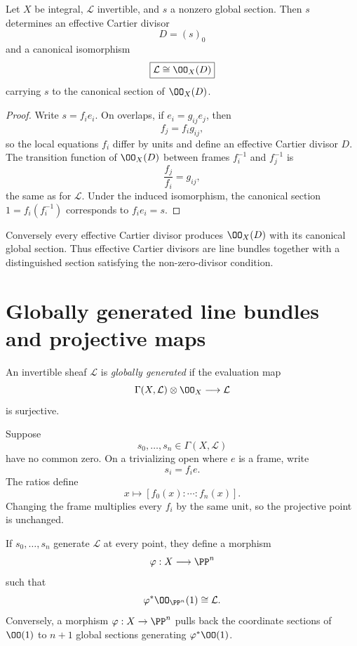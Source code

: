 \begin{theorem}\label{thm:vi42-section-divisor}
Let \(X\) be integral, \(\mathcal L\) invertible, and \(s\) a nonzero global section.  Then \(s\) determines an effective Cartier divisor
\[
  D=(s)_0
\]
and a canonical isomorphism
\[
  \boxed{\mathcal L\cong\OO_X(D)}
\]
carrying \(s\) to the canonical section of \(\OO_X(D)\).
\end{theorem}

\begin{proof}
Write \(s=f_i e_i\).  On overlaps, if \(e_i=g_{ij}e_j\), then
\[
  f_j=f_i g_{ij},
\]
so the local equations \(f_i\) differ by units and define an effective Cartier divisor \(D\).  The transition function of \(\OO_X(D)\) between frames \(f_i^{-1}\) and \(f_j^{-1}\) is
\[
  \frac{f_j}{f_i}=g_{ij},
\]
the same as for \(\mathcal L\).  Under the induced isomorphism, the canonical section \(1=f_i(f_i^{-1})\) corresponds to \(f_i e_i=s\).
\end{proof}

Conversely every effective Cartier divisor produces \(\OO_X(D)\) with its canonical global section.  Thus effective Cartier divisors are line bundles together with a distinguished section satisfying the non-zero-divisor condition.



\section{Globally generated line bundles and projective maps}

An invertible sheaf \(\mathcal L\) is \emph{globally generated} if the evaluation map
\[
  \Gamma(X,\mathcal L)\otimes\OO_X\longrightarrow\mathcal L
\]
is surjective.

Suppose
\[
  s_0,\ldots,s_n\in\Gamma(X,\mathcal L)
\]
have no common zero.  On a trivializing open where \(e\) is a frame, write
\[
  s_i=f_i e.
\]
The ratios define
\[
  x\longmapsto[f_0(x):\cdots:f_n(x)].
\]
Changing the frame multiplies every \(f_i\) by the same unit, so the projective point is unchanged.

\begin{theorem}\label{thm:vi42-sections-projective-map}
If \(s_0,\ldots,s_n\) generate \(\mathcal L\) at every point, they define a morphism
\[
  \varphi:X\longrightarrow\PP^n
\]
such that
\[
  \varphi^*\OO_{\PP^n}(1)\cong\mathcal L.
\]
Conversely, a morphism \(\varphi:X\to\PP^n\) pulls back the coordinate sections of \(\OO(1)\) to \(n+1\) global sections generating \(\varphi^*\OO(1)\).
\end{theorem}


